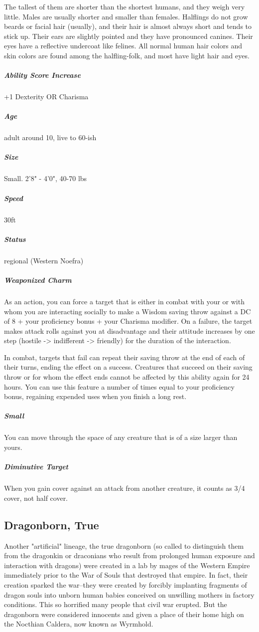 The tallest of them are shorter than the shortest humans, and they weigh very little.  Males are usually shorter and smaller than females. Halflings do not grow beards or facial hair (usually), and their hair is almost always short and tends to stick up. Their ears are slightly pointed and they have pronounced canines. Their eyes have a reflective undercoat like felines. All normal human hair colors and skin colors are found among the halfling-folk, and most have light hair and eyes.

\subparagraph*{Ability Score Increase}  +1 Dexterity OR Charisma

\subparagraph*{Age}  adult around 10, live to 60-ish

\subparagraph*{Size}  Small. 2'8" - 4'0", 40-70 lbs

\subparagraph*{Speed}  30ft

\subparagraph*{Status}  regional (Western Noefra)

\subparagraph*{Weaponized Charm}  As an action, you can force a target that is either in combat with your or with whom you are interacting socially to make a Wisdom saving throw against a DC of 8 + your proficiency bonus + your Charisma modifier. On a failure, the target makes attack rolls against you at disadvantage and their attitude increases by one step (hostile -> indifferent -> friendly) for the duration of the interaction. 

In combat, targets that fail can repeat their saving throw at the end of each of their turns, ending the effect on a success. Creatures that succeed on their saving throw or for whom the effect ends cannot be affected by this ability again for 24 hours. You can use this feature a number of times equal to your proficiency bonus, regaining expended uses when you finish a long rest.

\subparagraph*{Small}  You can move through the space of any creature that is of a size larger than yours.

\subparagraph*{Diminutive Target}  When you gain cover against an attack from another creature, it counts as 3/4 cover, not half cover.

\subsection{Dragonborn, True}\label{lineage:dragonborn}

Another "artificial" lineage, the true dragonborn (so called to distinguish them from the dragonkin or draconians who result from prolonged human exposure and interaction with dragons) were created in a lab by mages of the Western Empire immediately prior to the War of Souls that destroyed that empire. In fact, their creation sparked the war--they were created by forcibly implanting fragments of dragon souls into unborn human babies conceived on unwilling mothers in factory conditions. This so horrified many people that civil war erupted. But the dragonborn were considered innocents and given a place of their home high on the Nocthian Caldera, now known as Wyrmhold.

